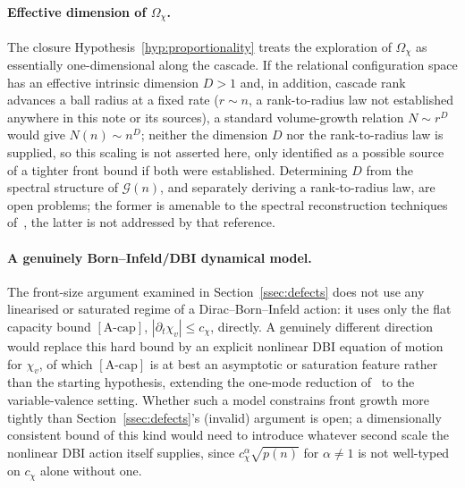 \documentclass[11pt,a4paper]{article}
\theoremstyle{definition}
\theoremstyle{remark}
\begin{document}
    \paragraph{Effective dimension of $\Omega_\chi$.}
      The closure Hypothesis~\ref{hyp:proportionality} treats the exploration of $\Omega_\chi$
      as essentially one-dimensional along the cascade.
      If the relational configuration space has an effective intrinsic dimension $D > 1$ and,
      in addition, cascade rank advances a ball radius at a fixed rate ($r \sim n$, a
      rank-to-radius law not established anywhere in this note or its sources), a standard
      volume-growth relation $N \sim r^D$ would give $N(n) \sim n^D$; neither the dimension
      $D$ nor the rank-to-radius law is supplied, so this scaling is not asserted here, only
      identified as a possible source of a tighter front bound if both were established.
      Determining $D$ from the spectral structure of $\mathcal{G}(n)$, and separately deriving
      a rank-to-radius law, are open problems; the former is amenable to the spectral
      reconstruction techniques of~\cite{Beau2026a}, the latter is not addressed by that
      reference.

    \paragraph{A genuinely Born--Infeld/DBI dynamical model.}
      The front-size argument examined in Section~\ref{ssec:defects} does not use any
      linearised or saturated regime of a Dirac--Born--Infeld action: it uses only the flat
      capacity bound $[\text{A-cap}]$, $|\partial_t \chi_v| \leq c_\chi$, directly.
      A genuinely different direction would replace this hard bound by an explicit nonlinear
      DBI equation of motion for $\chi_v$, of which $[\text{A-cap}]$ is at best an asymptotic
      or saturation feature rather than the starting hypothesis, extending the one-mode
      reduction of~\cite{Beau2026a1} to the variable-valence setting.
      Whether such a model constrains front growth more tightly than
      Section~\ref{ssec:defects}'s (invalid) argument is open; a dimensionally consistent
      bound of this kind would need to introduce whatever second scale the nonlinear DBI
      action itself supplies, since $c_\chi^\alpha \sqrt{p(n)}$ for $\alpha \neq 1$ is not
      well-typed on $c_\chi$ alone without one.
\end{document}
